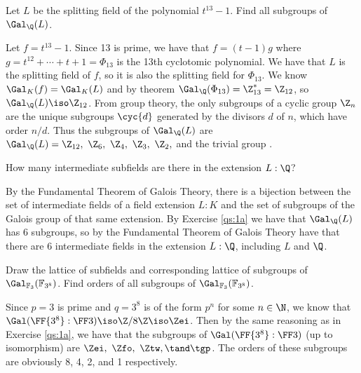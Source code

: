 \documentclass{article}
\begin{document}
\setcounter{section}{9} %
\begin{subexercise} \label{qs:1a} %
Let \( L \) be the splitting field of the polynomial \( t^{13} - 1 \). Find all subgroups of \( \Gal_{\Q}(L) \).
\end{subexercise}
\begin{solution}
Let \( f=t^{13}-1 \).
Since 13 is prime, we have that \( f = (t-1)g \) where \( g = t^{12}+\cdots+t+1 = \Phi_{13} \) is the 13th cyclotomic polynomial.
We have that \( L \) is the splitting field of \( f \), so it is also the splitting field for \( \Phi_{13} \).
We know \( \Gal_K(f) = \Gal_K(L) \) and by theorem \( \Gal_\Q(\Phi_{13}) = \Z^*_{13} = \Z_{12} \), so \( \Gal_\Q(L) \iso \Z_{12} \).
From group theory, the only subgroups of a cyclic group \( \Z_n \) are the unique subgroups \( \cyc{d} \) generated by the divisors \( d \) of \( n \), which have order \( n/d \).
Thus the subgroups of \( \Gal_\Q(L) \) are \( \Gal_\Q(L) = \Z_{12},\ \Z_6,\ \Z_4,\ \Z_3,\ \Z_2, \) and the trivial group \tgp.
\end{solution}

\begin{subexercise} \label{qs:1b} %
How many intermediate subfields are there in the extension \( L : \Q \)?
\end{subexercise}
\begin{solution}
By the Fundamental Theorem of Galois Theory, there is a bijection between the set of intermediate fields of a field extension \( L:K \) and the set of subgroups of the Galois group of that same extension.
By Exercise \ref{qs:1a} we have that \( \Gal_{\Q}(L) \) has 6 subgroups, so by the Fundamental Theorem of Galois Theory have that there are 6 intermediate fields in the extension \( L:\Q \), including \( L \) and \( \Q \).
\end{solution}

\begin{exercise} \label{qs:2} %
Draw the lattice of subfields and corresponding lattice of subgroups of \( \Gal_{\mathbb{F}_3}(\mathbb{F}_{3^8}) \). Find orders of all subgroups of \( \Gal_{\mathbb{F}_3}(\mathbb{F}_{3^8}) \).
\end{exercise}
\begin{solution}
Since \( p=3 \) is prime and \( q=3^8 \) is of the form \( p^n \) for some \( n\in \N \), we know that \( \Gal(\FF{3^{8}} : \FF 3) \iso \Z/8\Z \iso \Zei \).
Then by the same reasoning as in Exercise \ref{qs:1a}, we have that the subgroups of \( \Gal(\FF{3^{8}} : \FF 3) \) (up to isomorphism) are \( \Zei,\ \Zfo,\ \Ztw, \tand \tgp \).
The orders of these subgroups are obviously 8, 4, 2, and 1 respectively.
\end{solution}
\end{document}
